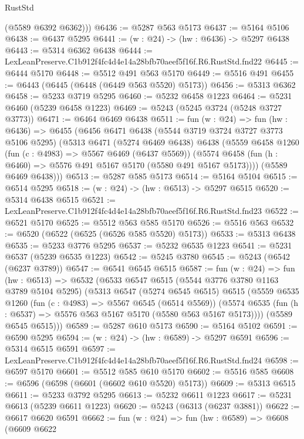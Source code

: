 \begin{lexlean}{RustStd}
\begin{coremodule}
        (@5589 @6392 @6362)))
@6436 := @5287 @563 @5173
@6437 := @5164 @5106
@6438 := @6437 @5295
@6441 := (w : @24) -> (hw : @6436) -> @5297 @6438
@6443 := @5314 @6362 @6438
@6444 := LexLeanPreserve.C1b912f4fc4d4e14a28bfb70aeef5f16f.R6.RustStd.fnd22
@6445 := @6444 @5170
@6448 := @5512 @491 @563 @5170
@6449 := @5516 @491
@6455 := @6443 (@6445 (@6448 (@6449 @563 @5520) @5173))
@6456 := @5313 @6362
@6458 := @5233 @3719 @5295
@6460 := @5232 @6458 @1223
@6464 := @5231 @6460 (@5239 @6458 @1223)
@6469 := @5243 (@5245 @3724 (@5248 @3727 @3773))
@6471 := @6464 @6469 @6438
@6511 := fun (w : @24) =>
  fun (hw : @6436) =>
  @6455
    (@6456
      @6471
      @6438
      (@5544 @3719 @3724 @3727 @3773 @5106 @5295)
      (@5313
        @6471
        (@5274 @6469 @6438)
        @6438
        (@5559
          @6458
          @1260
          (fun (c : @4983) => @5567 @6469 (@6437 @5569))
          (@5574 @6458 (fun (h : @6460) => @5576 @491 @5167 @5170 (@5580 @491 @5167 @5173))))
        (@5589 @6469 @6438)))
@6513 := @5287 @585 @5173
@6514 := @5164 @5104
@6515 := @6514 @5295
@6518 := (w : @24) -> (hw : @6513) -> @5297 @6515
@6520 := @5314 @6438 @6515
@6521 := LexLeanPreserve.C1b912f4fc4d4e14a28bfb70aeef5f16f.R6.RustStd.fnd23
@6522 := @6521 @5170
@6525 := @5512 @563 @585 @5170
@6526 := @5516 @563
@6532 := @6520 (@6522 (@6525 (@6526 @585 @5520) @5173))
@6533 := @5313 @6438
@6535 := @5233 @3776 @5295
@6537 := @5232 @6535 @1223
@6541 := @5231 @6537 (@5239 @6535 @1223)
@6542 := @5245 @3780
@6545 := @5243 (@6542 (@6237 @3789))
@6547 := @6541 @6545 @6515
@6587 := fun (w : @24) =>
  fun (hw : @6513) =>
  @6532
    (@6533
      @6547
      @6515
      (@5544 @3776 @3780 @1163 @3789 @5104 @5295)
      (@5313
        @6547
        (@5274 @6545 @6515)
        @6515
        (@5559
          @6535
          @1260
          (fun (c : @4983) => @5567 @6545 (@6514 @5569))
          (@5574 @6535 (fun (h : @6537) => @5576 @563 @5167 @5170 (@5580 @563 @5167 @5173))))
        (@5589 @6545 @6515)))
@6589 := @5287 @610 @5173
@6590 := @5164 @5102
@6591 := @6590 @5295
@6594 := (w : @24) -> (hw : @6589) -> @5297 @6591
@6596 := @5314 @6515 @6591
@6597 := LexLeanPreserve.C1b912f4fc4d4e14a28bfb70aeef5f16f.R6.RustStd.fnd24
@6598 := @6597 @5170
@6601 := @5512 @585 @610 @5170
@6602 := @5516 @585
@6608 := @6596 (@6598 (@6601 (@6602 @610 @5520) @5173))
@6609 := @5313 @6515
@6611 := @5233 @3792 @5295
@6613 := @5232 @6611 @1223
@6617 := @5231 @6613 (@5239 @6611 @1223)
@6620 := @5243 (@6313 (@6237 @3881))
@6622 := @6617 @6620 @6591
@6662 := fun (w : @24) =>
  fun (hw : @6589) =>
  @6608
    (@6609
      @6622

\end{coremodule}
\end{lexlean}
